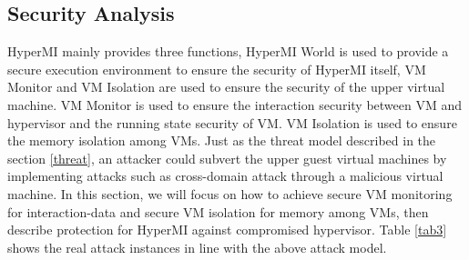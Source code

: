 \documentclass[conference]{IEEEtran}
\begin{document}
\subsection{Security Analysis}






HyperMI mainly provides three functions, HyperMI World is used to provide a secure execution environment to ensure the security of HyperMI itself, VM Monitor and VM Isolation are used to ensure the security of the upper virtual machine. VM Monitor is used to ensure the interaction security between VM and hypervisor and the running state security of VM. VM Isolation is used to ensure the memory isolation among VMs. Just as the threat model described in the section \ref{threat}, an attacker could subvert the upper guest virtual machines 
by implementing attacks such as cross-domain attack through a malicious virtual machine.
In this section, we will focus on how to achieve secure VM monitoring for interaction-data and secure VM isolation for memory among VMs, then describe protection for HyperMI against compromised hypervisor. Table \ref{tab3} shows the real attack instances in line with the above attack model. 

\end{document}
